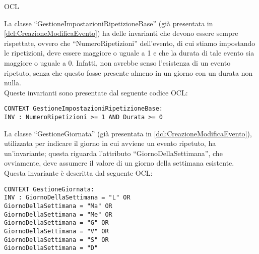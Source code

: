\begin{listaPersonale}{OCL}
    \begin{center}
        
    \end{center}
    La classe “GestioneImpostazioniRipetizioneBase” (già presentata in
    \ref{dcl:CreazioneModificaEvento}) ha delle invarianti che devono essere sempre rispettate, ovvero che “NumeroRipetizioni” dell'evento, di cui stiamo impostando le ripetizioni, deve essere maggiore o uguale a 1 e che la durata di tale evento sia maggiore o uguale a 0. Infatti, non avrebbe senso l'esistenza di un evento ripetuto, senza che questo fosse presente almeno in un giorno con un durata non nulla.\\
    Queste invarianti sono presentate dal seguente codice OCL:

    \begin{lstlisting}
CONTEXT GestioneImpostazioniRipetizioneBase:
INV : NumeroRipetizioni >= 1 AND Durata >= 0
    \end{lstlisting}




    \begin{center}
        
    \end{center}
    La classe “GestioneGiornata” (già presentata in \ref{dcl:CreazioneModificaEvento}), utilizzata per indicare il giorno in cui avviene un evento ripetuto, ha un'invariante; questa riguarda l'attributo “GiornoDellaSettimana”, che ovviamente, deve assumere il valore di un giorno della settimana esistente.\\
    Questa invariante è descritta dal seguente OCL:

    \begin{lstlisting}
CONTEXT GestioneGiornata:
INV : GiornoDellaSettimana = "L" OR
GiornoDellaSettimana = "Ma" OR
GiornoDellaSettimana = "Me" OR
GiornoDellaSettimana = "G" OR
GiornoDellaSettimana = "V" OR
GiornoDellaSettimana = "S" OR
GiornoDellaSettimana = "D"
    \end{lstlisting}





\end{listaPersonale}
